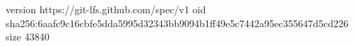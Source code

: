 version https://git-lfs.github.com/spec/v1
oid sha256:6aafc9c16cbfe5dda5995d32343bb9094b1ff49e5c7442a95ec355647d5cd226
size 43840

